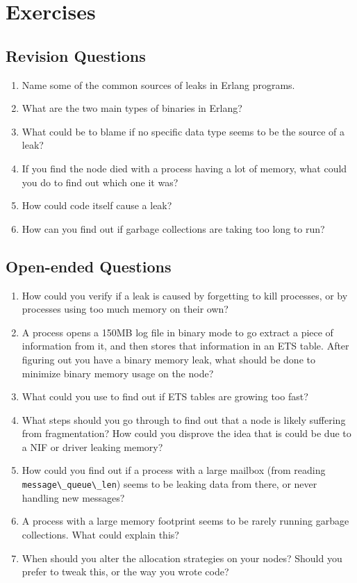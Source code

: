 \documentclass[11pt, oneside]{book}   	%
\newcommand{\term}[1]{\Verb`#1`}
\begin{document}
\section{Exercises}

\subsection{Revision Questions}

\begin{enumerate}
	\item Name some of the common sources of leaks in Erlang programs.
	\item What are the two main types of binaries in Erlang?
	\item What could be to blame if no specific data type seems to be the source of a leak?
	\item If you find the node died with a process having a lot of memory, what could you do to find out which one it was?
	\item How could code itself cause a leak?
	\item How can you find out if garbage collections are taking too long to run?
\end{enumerate}

\subsection{Open-ended Questions}

\begin{enumerate}
	\item  How could you verify if a leak is caused by forgetting to kill processes, or by processes using too much memory on their own?
	\item A process opens a 150MB log file in binary mode to go extract a piece of information from it, and then stores that information in an ETS table. After figuring out you have a binary memory leak, what should be done to minimize binary memory usage on the node?
	\item What could you use to find out if ETS tables are growing too fast?
	\item What steps should you go through to find out that a node is likely suffering from fragmentation? How could you disprove the idea that is could be due to a NIF or driver leaking memory?
	\item How could you find out if a process with a large mailbox (from reading \term{message\_queue\_len}) seems to be leaking data from there, or never handling new messages?
	\item A process with a large memory footprint seems to be rarely running garbage collections. What could explain this?
	\item When should you alter the allocation strategies on your nodes? Should you prefer to tweak this, or the way you wrote code?
\end{enumerate}
\end{document}
